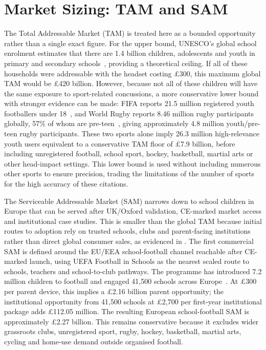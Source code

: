 \section{Market Sizing: TAM and SAM}

The Total Addressable Market (TAM) is treated here as a bounded opportunity rather than a single exact figure. For the upper bound, UNESCO's global school enrolment estimates that there are 1.4 billion children, adolescents and youth in primary and secondary schools~\cite{unesco2026gem}, providing a theoretical ceiling. If all of these households were addressable with the headset costing \pounds{}300, this maximum global TAM would be \pounds{}420 billion. However, because not all of these children will have the same exposure to sport-related concussions, a more conservative lower bound with stronger evidence can be made: FIFA reports 21.5 million registered youth footballers under 18~\cite{fifa2007bigcount}, and World Rugby reports 8.46 million rugby participants globally, 57\% of whom are pre-teen~\cite{worldrugby2023participation}, giving approximately 4.8 million youth/pre-teen rugby participants. These two sports alone imply 26.3 million high-relevance youth users equivalent to a conservative TAM floor of \pounds{}7.9 billion, before including unregistered football, school sport, hockey, basketball, martial arts or other head-impact settings. This lower bound is used without including numerous other sports to ensure precision, trading the limitations of the number of sports for the high accuracy of these citations.

The Serviceable Addressable Market (SAM) narrows down to school children in Europe that can be served after UK/Oxford validation, CE-marked market access and institutional case studies. This is smaller than the global TAM because initial routes to adoption rely on trusted schools, clubs and parent-facing institutions rather than direct global consumer sales, as evidenced in . The first commercial SAM is defined around the EU/EEA school-football channel reachable after CE-marked launch, using UEFA Football in Schools as the nearest scaled route to schools, teachers and school-to-club pathways. The programme has introduced 7.2 million children to football and engaged 41,500 schools across Europe~\cite{uefa2025schools}. At \pounds{}300 per parent device, this implies a \pounds{}2.16 billion parent opportunity; the institutional opportunity from 41,500 schools at \pounds{}2,700 per first-year institutional package adds \pounds{}112.05 million. The resulting European school-football SAM is approximately \pounds{}2.27 billion. This remains conservative because it excludes wider grassroots clubs, unregistered sport, rugby, hockey, basketball, martial arts, cycling and home-use demand outside organised football.

